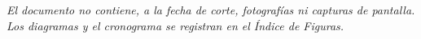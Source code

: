 \clearpage
\tableofcontents
\clearpage
\listoftables
\clearpage
\listoffigures
\clearpage
\listofimagenes
\noindent\textit{El documento no contiene, a la fecha de corte, fotografías ni capturas de pantalla. Los diagramas y el cronograma se registran en el Índice de Figuras.}
\clearpage
\listofecuaciones
\clearpage
\listofanexos
